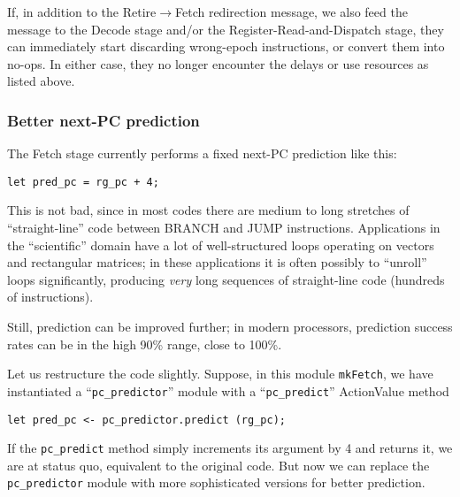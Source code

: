 If, in addition to the Retire$\longrightarrow$Fetch redirection
message, we also feed the message to the Decode stage and/or the
Register-Read-and-Dispatch stage, they can immediately start
discarding wrong-epoch instructions, or convert them into no-ops.  In
either case, they no longer encounter the delays or use resources as
listed above.


\subsubsection{Better next-PC prediction}

\label{Sec_better_next_PC_prediction}

The Fetch stage currently performs a fixed next-PC prediction like this:

{\footnotesize
\begin{Verbatim}[frame=single, label=src\_Fife/S1\_Fetch.bsv]
      let pred_pc = rg_pc + 4;
\end{Verbatim}
}

This is not bad, since in most codes there are medium to long
stretches of ``straight-line'' code between BRANCH and JUMP
instructions.  Applications in the ``scientific'' domain have a lot of
well-structured loops operating on vectors and rectangular matrices;
in these applications it is often possibly to ``unroll'' loops
significantly, producing \emph{very} long sequences of straight-line
code (hundreds of instructions).

Still, prediction can be improved further; in modern processors,
prediction success rates can be in the high 90\% range, close to
100\%.

Let us restructure the code slightly.  Suppose, in this module
\verb|mkFetch|, we have instantiated a ``\verb|pc_predictor|'' module
with a ``\verb|pc_predict|'' ActionValue method

{\footnotesize
\begin{Verbatim}[frame=single, label=src\_Fife/S1\_Fetch.bsv]
      let pred_pc <- pc_predictor.predict (rg_pc);
\end{Verbatim}
}

If the \verb|pc_predict| method simply increments its argument by 4
and returns it, we are at status quo, {\ie} equivalent to the original
code.  But now we can replace the \verb|pc_predictor| module with more
sophisticated versions for better prediction.

